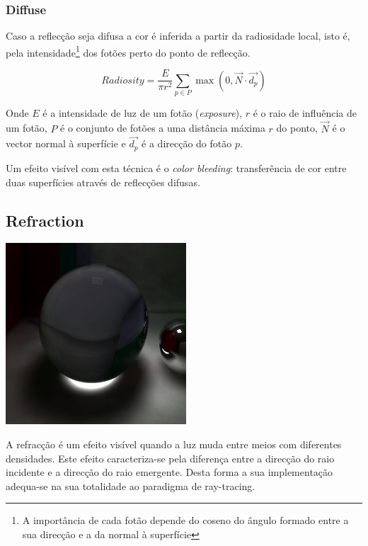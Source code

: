 \documentclass[a4paper]{article}
\begin{document}
\subsubsection{Diffuse}
\indent \indent Caso a reflecção seja difusa a cor é inferida a partir da radiosidade local,
isto é, pela intensidade\footnote{A importância de cada fotão depende do coseno do ângulo formado entre a sua direcção e a da normal à superfície} dos fotões perto do ponto de reflecção.

\begin{displaymath}
	Radiosity = \frac{E}{\pi r^{2}} \sum \limits_{p \in P}{\max(0, \vec{N} \cdot \vec{d_{p}})}
\end{displaymath}

\indent Onde $E$ é a intensidade de luz de um fotão (\emph{exposure}), $r$ é o raio de influência de um fotão,
$P$ é o conjunto de fotões a uma distância máxima $r$ do ponto, $\vec{N}$ é o vector normal à superfície
e $\vec{d_{p}}$ é a direcção do fotão $p$.

\indent Um efeito visível com esta técnica é o \emph{color bleeding}: transferência de cor entre duas superfícies
através de reflecções difusas.

\cleardoublepage
\subsection{Refraction}
\begin{center}
	\includegraphics[scale=0.50]{images/caustics.png}
	\label{fig:caustics}
\end{center}

\indent A refracção é um efeito visível quando a luz muda entre meios com diferentes densidades.
Este efeito caracteriza-se pela diferença entre a direcção do raio incidente e a direcção do raio emergente. 
Desta forma a sua implementação adequa-se na sua totalidade ao paradigma de ray-tracing.
\end{document}
